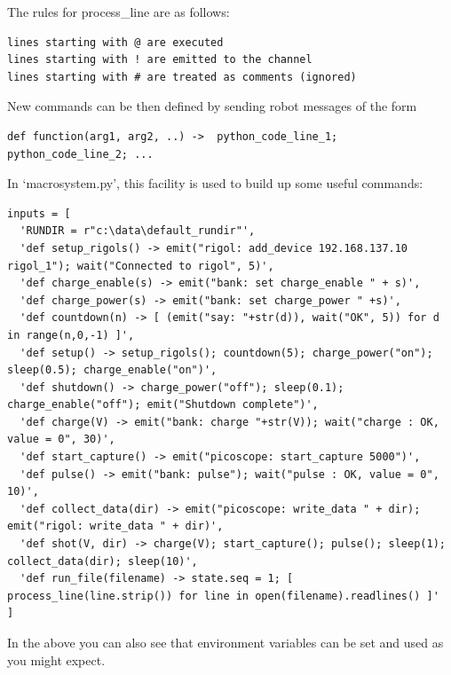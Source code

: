 The rules for process\_line are as follows:
\begin{verbatim}
lines starting with @ are executed
lines starting with ! are emitted to the channel
lines starting with # are treated as comments (ignored)
\end{verbatim}

New commands can be then defined by sending robot messages of the form
\begin{verbatim}
def function(arg1, arg2, ..) ->  python_code_line_1; python_code_line_2; ...
\end{verbatim}

In `macrosystem.py', this facility is used to build up some useful commands:

\tiny{
\begin{verbatim}
inputs = [
  'RUNDIR = r"c:\data\default_rundir"',
  'def setup_rigols() -> emit("rigol: add_device 192.168.137.10 rigol_1"); wait("Connected to rigol", 5)',
  'def charge_enable(s) -> emit("bank: set charge_enable " + s)',
  'def charge_power(s) -> emit("bank: set charge_power " +s)',
  'def countdown(n) -> [ (emit("say: "+str(d)), wait("OK", 5)) for d in range(n,0,-1) ]',
  'def setup() -> setup_rigols(); countdown(5); charge_power("on"); sleep(0.5); charge_enable("on")',
  'def shutdown() -> charge_power("off"); sleep(0.1); charge_enable("off"); emit("Shutdown complete")',
  'def charge(V) -> emit("bank: charge "+str(V)); wait("charge : OK, value = 0", 30)',
  'def start_capture() -> emit("picoscope: start_capture 5000")',
  'def pulse() -> emit("bank: pulse"); wait("pulse : OK, value = 0", 10)',
  'def collect_data(dir) -> emit("picoscope: write_data " + dir); emit("rigol: write_data " + dir)',
  'def shot(V, dir) -> charge(V); start_capture(); pulse(); sleep(1); collect_data(dir); sleep(10)',
  'def run_file(filename) -> state.seq = 1; [  process_line(line.strip()) for line in open(filename).readlines() ]'
]
\end{verbatim}
}

In the above you can also see that environment variables can be set and used as you might expect.


